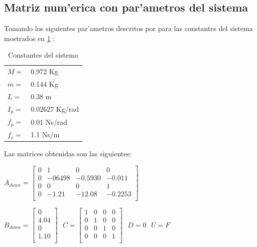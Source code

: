 \subsection{Matriz num'erica con par'ametros del sistema}

Tomando los siguientes par'ametros descritos por \citet{montalvo} para las constantes del sistema mostrados en \ref{constantes} :

\begin{table}[ht]
\centering
\begin{tabular}{ll}
$M =$ &  0.972 Kg\\
$m =$  & 0.144 Kg\\
$L =$  & 0.38 m\\
$I_{p} =$  & 0.02627 Kg/rad\\
$f_{p} =$  & 0.01 Ns/rad\\
$f_{c} =$  & 1.1 Ns/m\\
 
\end{tabular}
\caption{Constantes del sistema}
\label{constantes}
\end{table}

Las matrices obtenidas son las siguientes:


\begin{center}
$
A_{down}=\left[
\begin{array}{cccc}
0 & 1 & 0 & 0 \\
0 & -06498 & -0.5930 & -0.011 \\
0 & 0 & 0 & 1 \\
0 & -1.21& -12.08 & -0.2253\\
\end{array}
\right]
$
\end{center}

\begin{center}
$
B_{down}=\left[
\begin{array}{c}
0  \\
 4.04\\
0 \\
1.10 \\
\end{array}
\right]
\hspace{8pt}
C=\left[
\begin{array}{cccc}
1 & 0 & 0 & 0 \\
0 & 1 & 0 & 0 \\
0 & 0 & 1 & 0 \\
0 & 0 & 0 & 1 \\
\end{array}
\right]
\hspace{8pt}
D= 0
\hspace{8pt}
U= F
$
\end{center}

